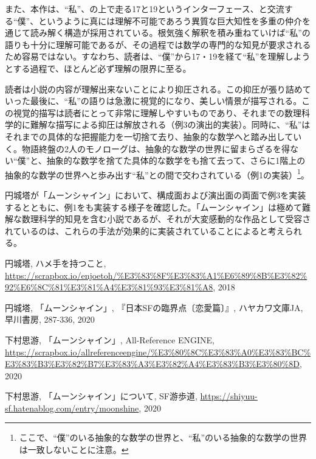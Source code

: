 \documentclass[10pt, a5paper, twoside]{jsarticle}
\theoremstyle{definition}
\begin{document}
		また、本作は、“私”、の上で走る17と19というインターフェース、と交流する“僕”、というように真には理解不可能であろう異質な巨大知性を多重の仲介を通じて読み解く構造が採用されている。根気強く解釈を積み重ねていけば“私”の語りも十分に理解可能であるが、その過程では数学の専門的な知見が要求されるため容易ではない。すなわち、読者は、“僕”から17・19を経て“私”を理解しようとする過程で、ほとんど必ず理解の限界に至る。

		読者は小説の内容が理解出来ないことにより抑圧される。この抑圧が張り詰めていった最後に、“私”の語りは急激に視覚的になり、美しい情景が描写される。この視覚的描写は読者にとって非常に理解しやすいものであり、それまでの数理科学的に難解な描写による抑圧は解放される（例3の演出的実装）。同時に、“私”はそれまでの具体的な把握能力を一切捨て去り、抽象的な数学へと踏み出していく。物語終盤の2人のモノローグは、抽象的な数学の世界に留まらざるを得ない“僕”と、抽象的な数学を捨てた具体的な数学をも捨て去って、さらに1階上の抽象的な数学の世界へと歩み出す“私”との間で交わされている（例1の実装）\footnote{ここで、“僕”のいる抽象的な数学の世界と、“私”のいる抽象的な数学の世界は一致しないことに注意。}。

		円城塔が「ムーンシャイン」において、構成面および演出面の両面で例3を実装するとともに、例1をも実装する様子を確認した。「ムーンシャイン」は極めて難解な数理科学的知見を含む小説であるが、それが大変感動的な作品として受容されているのは、これらの手法が効果的に実装されていることによると考えられる。		

	\begin{thebibliography}{99}

		 円城塔, ハメ手を持つこと, \url{https://scrapbox.io/enjoetoh/%E3%83%8F%E3%83%A1%E6%89%8B%E3%82%92%E6%8C%81%E3%81%A4%E3%81%93%E3%81%A8}, 2018

		 円城塔, 「ムーンシャイン」, 『日本SFの臨界点〔恋愛篇〕』, ハヤカワ文庫JA, 早川書房, 287-336, 2020

		 下村思游, 「ムーンシャイン」, All-Reference ENGINE, \url{https://scrapbox.io/allreferenceengine/%E3%80%8C%E3%83%A0%E3%83%BC%E3%83%B3%E3%82%B7%E3%83%A3%E3%82%A4%E3%83%B3%E3%80%8D}, 2020

		 下村思游, 「ムーンシャイン」について, SF游歩道, \url{https://shiyuu-sf.hatenablog.com/entry/moonshine}, 2020

	\end{thebibliography}
\end{document}
